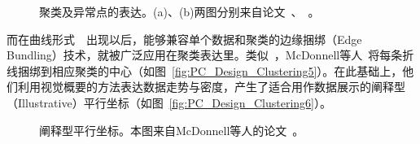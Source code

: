 \documentclass[12pt,twocolumn]{article}
\begin{document}
\begin{figure}[!htb]
\centering
{}
\caption{聚类及异常点的表达。(a)、(b)两图分别来自论文~\citep{fua1999hierarchical}、~\citep{novotny2006outlier}。}
\end{figure}

而在曲线形式~\citep{theisel2000higher}~\citep{artero2004uncovering}出现以后，能够兼容单个数据和聚类的边缘捆绑（Edge Bundling）技术，就被广泛应用在聚类表达里。类似~\citep{zhou2008visual}，McDonnell等人~\citep{mcdonnell2008illustrative}将每条折线捆绑到相应聚类的中心（如图~\ref{fig:PC_Design_Clustering5}）。在此基础上，他们利用视觉概要的方法表达数据走势与密度，产生了适合用作数据展示的阐释型（Illustrative）平行坐标（如图~\ref{fig:PC_Design_Clustering6}）。

\begin{figure}[!htb]
\centering
{}
\caption{阐释型平行坐标。本图来自McDonnell等人的论文~\citep{mcdonnell2008illustrative}。}
\end{figure}
\end{document}
